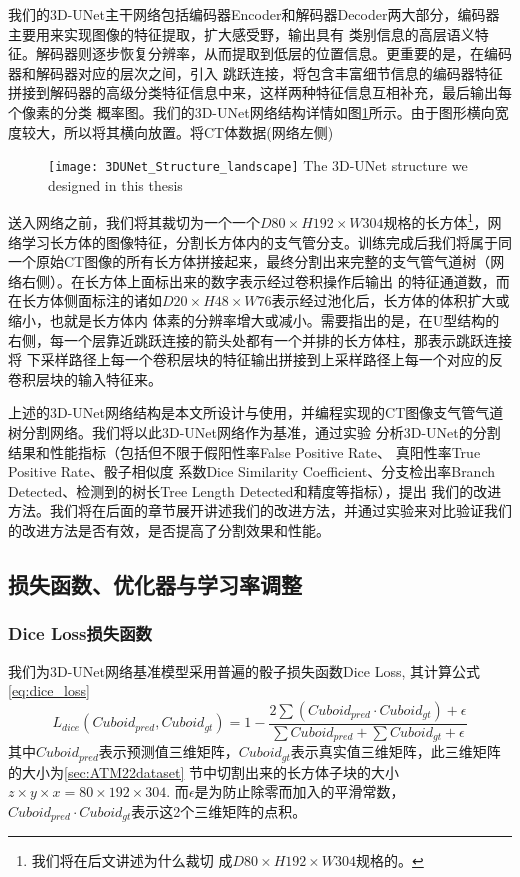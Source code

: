 我们的3D-UNet主干网络包括编码器Encoder和解码器Decoder两大部分，编码器主要用来实现图像的特征提取，扩大感受野，输出具有
类别信息的高层语义特征。解码器则逐步恢复分辨率，从而提取到低层的位置信息。更重要的是，在编码器和解码器对应的层次之间，引入
跳跃连接，将包含丰富细节信息的编码器特征拼接到解码器的高级分类特征信息中来，这样两种特征信息互相补充，最后输出每个像素的分类
概率图。我们的3D-UNet网络结构详情如图\ref{fig:3DUNetStructure}所示。由于图形横向宽度较大，所以将其横向放置。将CT体数据(网络左侧)
\begin{figure}[!ht]
    \centering
    \texttt{[image: 3DUNet\_Structure\_landscape]}
        {The 3D-UNet structure we designed in this thesis}
    \label{fig:3DUNetStructure}
\end{figure}
送入网络之前，我们将其裁切为一个一个$D80 \times H192 \times W304$规格的长方体\footnote{我们将在后文讲述为什么裁切
成$D80 \times H192 \times W304$规格的。}，网络学习长方体的图像特征，分割长方体内的支气管分支。训练完成后我们将属于同
一个原始CT图像的所有长方体拼接起来，最终分割出来完整的支气管气道树（网络右侧）。在长方体上面标出来的数字表示经过卷积操作后输出
的特征通道数，而在长方体侧面标注的诸如$D20 \times H48 \times W76$表示经过池化后，长方体的体积扩大或缩小，也就是长方体内
体素的分辨率增大或减小。需要指出的是，在U型结构的右侧，每一个层靠近跳跃连接的箭头处都有一个并排的长方体柱，那表示跳跃连接将
下采样路径上每一个卷积层块的特征输出拼接到上采样路径上每一个对应的反卷积层块的输入特征来。

上述的3D-UNet网络结构是本文所设计与使用，并编程实现的CT图像支气管气道树分割网络。我们将以此3D-UNet网络作为基准，通过实验
分析3D-UNet的分割结果和性能指标（包括但不限于假阳性率False Positive Rate、 真阳性率True Positive Rate、骰子相似度
系数Dice Similarity Coefficient、分支检出率Branch Detected、检测到的树长Tree Length Detected和精度等指标），提出
我们的改进方法。我们将在后面的章节展开讲述我们的改进方法，并通过实验来对比验证我们的改进方法是否有效，是否提高了分割效果和性能。

\subsection{损失函数、优化器与学习率调整}
\subsubsection{Dice Loss损失函数}
我们为3D-UNet网络基准模型采用普遍的骰子损失函数Dice Loss, 其计算公式\ref{eq:dice_loss}
\begin{equation}\label{eq:dice_loss}
    L_{dice}\left(Cuboid_{pred}, Cuboid_{gt}\right) = 1 - \frac{2\sum{\left(Cuboid_{pred} \cdot Cuboid_{gt}\right)} + \epsilon}
    {\sum{Cuboid_{pred}} + \sum{Cuboid_{gt}} + \epsilon}
\end{equation}
其中${Cuboid}_{pred}$表示预测值三维矩阵，${Cuboid}_{gt}$表示真实值三维矩阵，此三维矩阵的大小为\ref{sec:ATM22dataset}
节中切割出来的长方体子块的大小$z \times y \times x = 80 \times 192 \times 304$. 而$\epsilon$是为防止除零而加入的平滑常数，
$Cuboid_{pred} \cdot Cuboid_{gt}$表示这2个三维矩阵的点积。

